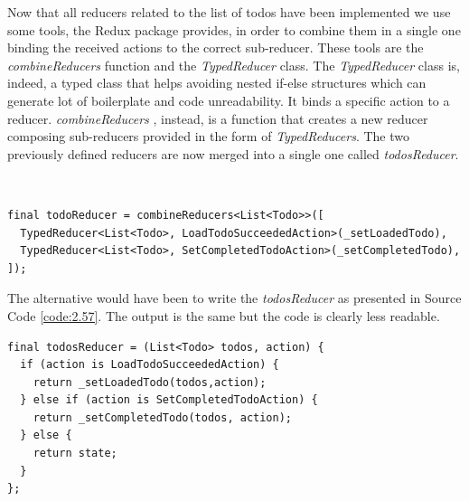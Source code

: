 Now that all reducers related to the list of todos have been implemented we use some tools, the Redux package provides, in order to combine them in a single one binding the received actions to the correct sub-reducer. These tools are the \textit{combineReducers} function and the \textit{TypedReducer} class. The \textit{TypedReducer} class is, indeed, a typed class that helps avoiding nested if-else structures which can generate lot of boilerplate and code unreadability. It binds a specific action to a reducer. \textit{combineReducers} , instead, is a function that creates a new reducer composing sub-reducers provided in the form of \textit{TypedReducers}. The two previously defined reducers are now merged into a single one called \textit{todosReducer}.
\begin{code}
\mbox{}\\
 \mbox{}
		\label{code:2.56}
\begin{verbatim}
final todoReducer = combineReducers<List<Todo>>([
  TypedReducer<List<Todo>, LoadTodoSucceededAction>(_setLoadedTodo),
  TypedReducer<List<Todo>, SetCompletedTodoAction>(_setCompletedTodo),
]);
\end{verbatim}
\mbox{}
\end{code}

The alternative would have been to write the \textit{todosReducer} as presented in Source Code \ref{code:2.57}. The output is the same but the code is clearly less readable.
\begin{code}
\mbox{}
 \mbox{}
		\label{code:2.57}
\begin{verbatim}
final todosReducer = (List<Todo> todos, action) {
  if (action is LoadTodoSucceededAction) {
    return _setLoadedTodo(todos,action);
  } else if (action is SetCompletedTodoAction) {
    return _setCompletedTodo(todos, action);
  } else {
    return state;
  }
};
\end{verbatim}
\mbox{}
\end{code}

